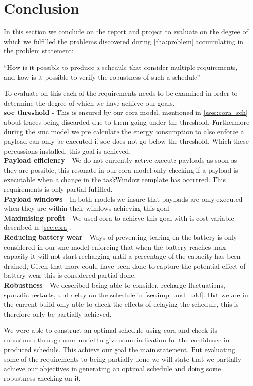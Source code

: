 \section{Conclusion} \label{sec:conclusion}
In this section we conclude on the report and project to evaluate on the degree of which we fulfilled the problems discovered during  \cref{cha:problem} accumulating in the problem statement:

\enquote{How is it possible to produce a schedule that consider multiple requirements, and how is it possible to verify the robustness of such a schedule}

To evaluate on this each of the requirements needs to be examined in order to determine the degree of which we have achieve our goals.\\
\textbf{\Gls{soc} threshold} - This is ensured by our \gls{cora} model, mentioned in  \cref{ssec:cora_sch} about traces being discarded due to them going under the threshold. Furthermore during the \gls{smc} model we pre calculate the energy consumption to also enforce a payload can only be executed if \gls{soc} does not go below the threshold.  Which these percussions installed, this goal is achieved.\\
\textbf{Payload efficiency} - We do not currently active execute payloads as soon as they are possible, this resonate in our \gls{cora} model only checking if a payload is executable when a change in the taskWindow template has occurred. This requirements is only partial fulfilled.\\
\textbf{Payload windows} - In both models we insure that payloads are only executed when they are within their windows achieving this goal \\
\textbf{Maximising profit} - We used \gls{cora} to achieve this goal with is cost variable described in  \cref{sec:cora}.\\
\textbf{Reducing battery wear} - Ways of preventing tearing on the battery is only considered in our \gls{smc} model enforcing that when the battery reaches max capacity it will not start recharging until a percentage of the capacity has been drained, Given that more could have been done to capture the potential effect of battery wear this is considered partial done. \\
\textbf{Robustness} - We described being able to consider, recharge fluctuations, sporadic restarts, and delay on the schedule in  \cref{sec:imp_and_add}. But we are in the current build only able to check the effects of delaying the schedule, this is therefore only be partially achieved.

We were able to construct an optimal schedule using \gls{cora} and check its robustness through \gls{smc} model to give some indication for the confidence in produced schedule. This achieve our goal the main statement. But evaluating some of the requirements to being partially done we will state that we partially achieve our objectives in generating an optimal schedule and doing some robustness checking on it.